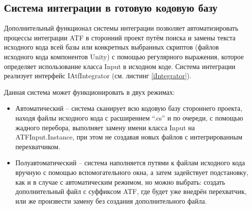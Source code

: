 \subsection{Система интеграции в готовую кодовую базу}
Дополнительный функционал системы интеграции позволяет автоматизировать процессы интеграции ATF в сторонний проект путём поиска и замены текста исходного кода всей базы или конкретных выбранных скриптов (файлов исходного кода компонентов Unity) с помощью регулярного выражения, которое определяет использование класса Input в исходном коде. Система интеграции реализует интерфейс IAtfIntegrator (см. листинг \ref{iIntegrator}).

Данная система может функционировать в двух режимах:
\begin{itemize}
	\item Автоматический -- система сканирует всю кодовую базу стороннего проекта, находя файлы исходного кода с расширением ``.cs'' и по очереди, с помощью жадного перебора, выполняет замену имени класса Input на ATFInput.Instance, при этом не создавая новых файлов с интегрированным перехватчиком.
	\item Полуавтоматический -- система наполняется путями к файлам исходного кода вручную с помощью вспомогательного окна, а затем задействует подстановку, как и в случае с автоматическим режимом, но можно выбрать: создать дополнительный файл с суффиксом ATF, где будет уже внедрён перехватчик, или же произвести замену без создания дополнительного файла.
\end{itemize}